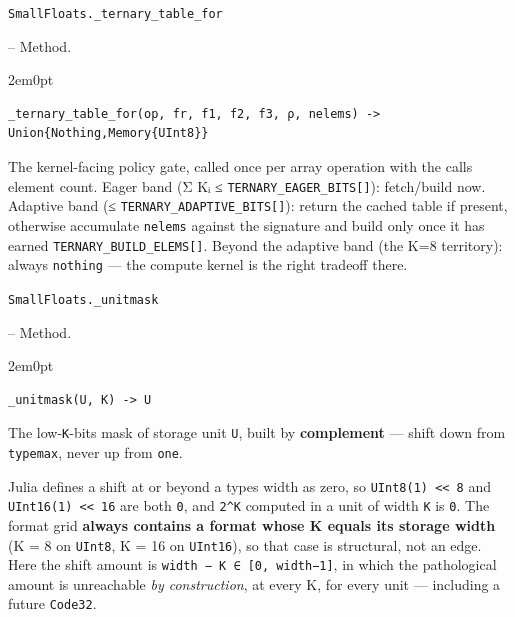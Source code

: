 \par\medskip\noindent\begin{minipage}{\linewidth}
\hypertarget{942381566965426910}{\texttt{SmallFloats.\_\allowbreak{}ternary\_\allowbreak{}table\_\allowbreak{}for}}  -- {Method.}
\nopagebreak
\begin{adjustwidth}{2em}{0pt}


\begin{verbatim}
_ternary_table_for(op, fr, f1, f2, f3, ρ, nelems) -> Union{Nothing,Memory{UInt8}}
\end{verbatim}

The kernel-facing policy gate, called once per array operation with the call{\textquotesingle}s element count. Eager band (Σ Kᵢ ≤ \texttt{TERNARY\_\allowbreak{}EAGER\_\allowbreak{}BITS[]}): fetch/build now. Adaptive band (≤ \texttt{TERNARY\_\allowbreak{}ADAPTIVE\_\allowbreak{}BITS[]}): return the cached table if present, otherwise accumulate \texttt{nelems} against the signature and build only once it has earned \texttt{TERNARY\_\allowbreak{}BUILD\_\allowbreak{}ELEMS[]}. Beyond the adaptive band (the K=8 territory): always \texttt{nothing} — the compute kernel is the right tradeoff there.



\end{adjustwidth}
\end{minipage}
\par\medskip

\par\medskip\noindent\begin{minipage}{\linewidth}
\hypertarget{12144973337474854137}{\texttt{SmallFloats.\_\allowbreak{}unitmask}}  -- {Method.}
\nopagebreak
\begin{adjustwidth}{2em}{0pt}


\begin{verbatim}
_unitmask(U, K) -> U
\end{verbatim}

The low-\texttt{K}-bits mask of storage unit \texttt{U}, built by \textbf{complement} — shift down from \texttt{typemax}, never up from \texttt{one}.

Julia defines a shift at or beyond a type{\textquotesingle}s width as zero, so \texttt{UInt8(1) << 8} and \texttt{UInt16(1) << 16} are both \texttt{0}, and \texttt{2{\textasciicircum}K} computed in a unit of width \texttt{K} is \texttt{0}. The format grid \textbf{always contains a format whose K equals its storage width} (K = 8 on \texttt{UInt8}, K = 16 on \texttt{UInt16}), so that case is structural, not an edge. Here the shift amount is \texttt{width − K ∈ [0, width−1]}, in which the pathological amount is unreachable \emph{by construction}, at every K, for every unit — including a future \texttt{Code32}.



\end{adjustwidth}
\end{minipage}
\par\medskip

